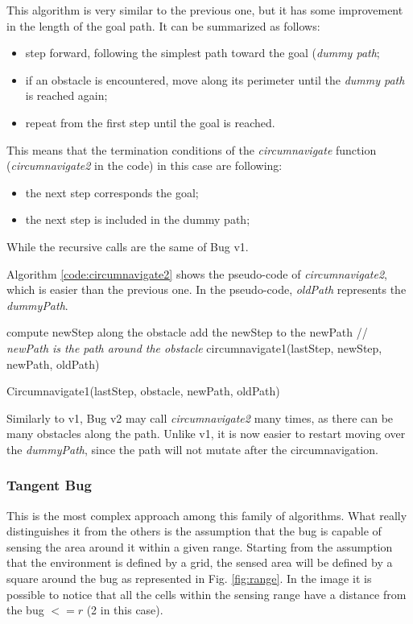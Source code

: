 \documentclass[conference]{IEEEtran}
\begin{document}
This algorithm is very similar to the previous one, but it has some improvement in the length of the goal path. It can be summarized as follows:
\begin{itemize}
	\item step forward, following the simplest path toward the goal (\emph{dummy path};
	\item if an obstacle is encountered, move along its perimeter until the \emph{dummy path} is reached again;
	\item repeat from the first step until the goal is reached.
\end{itemize}

This means that the termination conditions of the \emph{circumnavigate} function (\emph{circumnavigate2} in the code) in this case are following:
\begin{itemize}
	\item the next step corresponds the goal;
	\item the next step is included in the dummy path;
\end{itemize}

While the recursive calls are the same of Bug v1.

Algorithm \ref{code:circumnavigate2} shows the pseudo-code of \emph{circumnavigate2}, which is easier than the previous one. In the pseudo-code, \emph{oldPath} represents the \emph{dummyPath}.

\begin{algorithm}
	compute newStep along the obstacle\;
	add the newStep to the newPath //\emph{ newPath is the path around the obstacle}\;
	\Return circumnavigate1(lastStep, newStep, newPath, oldPath)\;
	\label{code:circumnavigate2}
	\caption{Circumnavigate1(lastStep, obstacle, newPath, oldPath)}
\end{algorithm}

Similarly to v1, Bug v2 may call \emph{circumnavigate2} many times, as there can be many obstacles along the path. Unlike v1, it is now easier to restart moving over the \emph{dummyPath}, since the path will not mutate after the circumnavigation.

\subsubsection{Tangent Bug}
This is the most complex approach among this family of algorithms. What really distinguishes it from the others is the assumption that the bug is capable of sensing the area around it within a given range. Starting from the assumption that the environment is defined by a grid, the sensed area will be defined by a square around the bug as represented in Fig. \ref{fig:range}. In the image it is possible to notice that all the cells within the sensing range have a distance from the bug $<= r$ (2 in this case).
\end{document}
